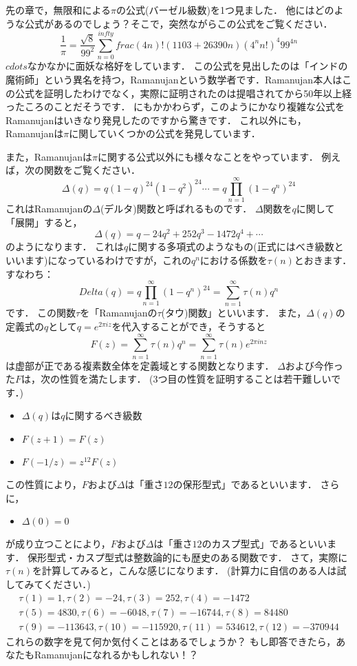 先の章で，無限和による$\pi$の公式(バーゼル級数)を1つ見ました．
他にはどのような公式があるのでしょう？そこで，突然ながらこの公式をご覧ください．
\[
\frac{1}{\pi}=\frac{\sqrt{8}}{99^2} \sum_{n=0}^{infty}frac{(4n)! (1103+26390n)}{(4^{n}n!)^{4}99^{4n}}
\]
$cdots$なかなかに面妖な格好をしています．
この公式を見出したのは「インドの魔術師」という異名を持つ，Ramanujanという数学者です．Ramanujan本人はこの公式を証明したわけでなく，実際に証明されたのは提唱されてから50年以上経ったころのことだそうです．
にもかかわらず，このようにかなり複雑な公式をRamanujanはいきなり発見したのですから驚きです．
これ以外にも，Ramanujanは$\pi$に関していくつかの公式を発見しています．

また，Ramanujanは$\pi$に関する公式以外にも様々なことをやっています．
例えば，次の関数をご覧ください．
\[
	\Delta (q)=q(1-q)^{24}(1-q^{2})^{24} \cdots = q\prod_{n=1}^{\infty}(1-q^n)^24
\]
これはRamanujanの$\Delta$(デルタ)関数と呼ばれるものです．
$\Delta$関数を$q$に関して「展開」すると，
\[
	\Delta (q)=q-24q^{2}+252q^{3}-1472q^{4}+\cdots
\]
のようになります．
これは$q$に関する多項式のようなもの(正式にはべき級数といいます)になっているわけですが，これの$q^n$における係数を$\tau (n)$とおきます．
すなわち：
\[
	Delta (q)=q\prod_{n=1}^{\infty}(1-q^n)^24 = \sum_{n=1}^{\infty} \tau (n) q^{n}
\]
です．
この関数$\tau$を「Ramanujanの$\tau$(タウ)関数」といいます．
また，$\Delta(q)$の定義式の$q$として$q=e^{2\pi iz}$を代入することができ，そうすると
\[
	F(z)=\sum_{n=1}^{\infty} \tau (n) q^{n}=\sum_{n=1}^{\infty} \tau (n) e^{2 \pi inz}
\]
は虚部が正である複素数全体を定義域とする関数となります．
$\Delta$および今作った$F$は，次の性質を満たします．
(3つ目の性質を証明することは若干難しいです．)
\begin{itemize}
	\item $\Delta (q)$は$q$に関するべき級数
	\item $F(z+1)=F(z)$
	\item $F(-1/z)=z^12 F(z)$
\end{itemize}
この性質により，$F$および$\Delta$は「重さ$12$の保形型式」であるといいます．
さらに，
\begin{itemize}
	\item $\Delta(0)=0$
\end{itemize}
が成り立つことにより，$F$および$\Delta$は「重さ$12$のカスプ型式」であるといいます．
保形型式・カスプ型式は整数論的にも歴史のある関数です．
さて，実際に$\tau (n)$を計算してみると，こんな感じになります．
(計算力に自信のある人は試してみてください．)
\begin{eqnarray*}
\tau(1)=1, \tau(2)=-24, \tau(3)=252, \tau(4)=-1472 \\
\tau (5)=4830, \tau(6)=-6048, \tau(7)=-16744, \tau(8)=84480 \\
\tau(9)=-113643, \tau(10)=-115920, \tau(11)=534612, \tau(12)=-370944
\end{eqnarray*}
これらの数字を見て何か気付くことはあるでしょうか？
もし即答できたら，あなたもRamanujanになれるかもしれない！？

